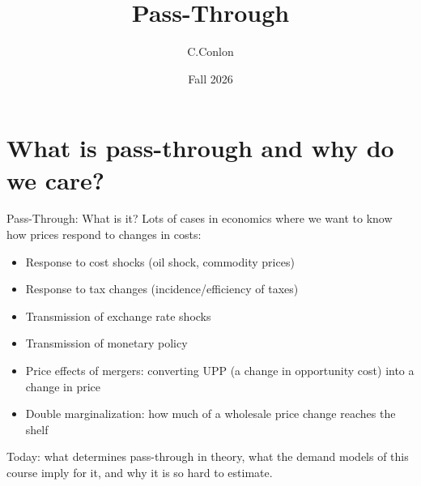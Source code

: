 \documentclass[aspectratio=169,10pt]{beamer}
\title{Pass-Through}
\author{C.Conlon}
\institute{Grad IO}
\date{Fall 2026}
\begin{document}
\frame{\titlepage}

\section{What is pass-through and why do we care?}

\begin{frame}{Pass-Through: What is it?}
Lots of cases in economics where we want to know how prices respond to changes in costs:
\begin{itemize}
    \item Response to cost shocks (oil shock, commodity prices)
    \item Response to tax changes (incidence/efficiency of taxes)
    \item Transmission of exchange rate shocks
    \item Transmission of monetary policy
    \item Price effects of mergers: converting \alert{UPP} (a change in opportunity cost) into a change in price
    \item Double marginalization: how much of a wholesale price change reaches the shelf
\end{itemize}
Today: what determines pass-through in theory, what the demand models of this course imply for it, and why it is so hard to estimate.
\end{frame}
\end{document}
